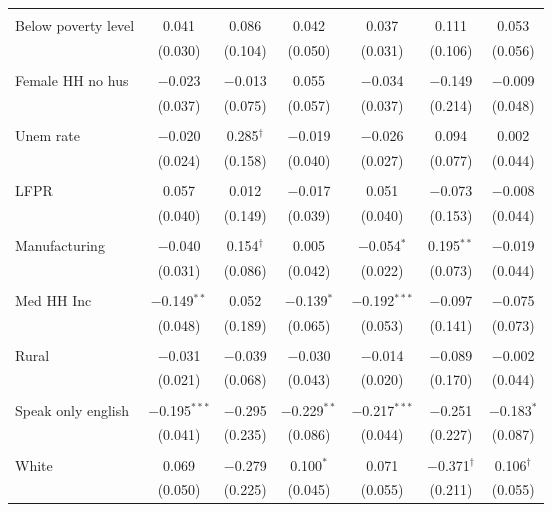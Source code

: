 \begin{table}[!htbp]
\begin{tabular}{@{\extracolsep{5pt}}lcccccc}
  & & & & & & \\ 
 Below poverty level & 0.041 & 0.086 & 0.042 & 0.037 & 0.111 & 0.053 \\ 
  & (0.030) & (0.104) & (0.050) & (0.031) & (0.106) & (0.056) \\ 
  & & & & & & \\ 
 Female HH no hus & $-$0.023 & $-$0.013 & 0.055 & $-$0.034 & $-$0.149 & $-$0.009 \\ 
  & (0.037) & (0.075) & (0.057) & (0.037) & (0.214) & (0.048) \\ 
  & & & & & & \\ 
 Unem rate & $-$0.020 & 0.285$^{\dag}$ & $-$0.019 & $-$0.026 & 0.094 & 0.002 \\ 
  & (0.024) & (0.158) & (0.040) & (0.027) & (0.077) & (0.044) \\ 
  & & & & & & \\ 
 LFPR & 0.057 & 0.012 & $-$0.017 & 0.051 & $-$0.073 & $-$0.008 \\ 
  & (0.040) & (0.149) & (0.039) & (0.040) & (0.153) & (0.044) \\ 
  & & & & & & \\ 
 Manufacturing & $-$0.040 & 0.154$^{\dag}$ & 0.005 & $-$0.054$^{*}$ & 0.195$^{**}$ & $-$0.019 \\ 
  & (0.031) & (0.086) & (0.042) & (0.022) & (0.073) & (0.044) \\ 
  & & & & & & \\ 
 Med HH Inc & $-$0.149$^{**}$ & 0.052 & $-$0.139$^{*}$ & $-$0.192$^{***}$ & $-$0.097 & $-$0.075 \\ 
  & (0.048) & (0.189) & (0.065) & (0.053) & (0.141) & (0.073) \\ 
  & & & & & & \\ 
 Rural & $-$0.031 & $-$0.039 & $-$0.030 & $-$0.014 & $-$0.089 & $-$0.002 \\ 
  & (0.021) & (0.068) & (0.043) & (0.020) & (0.170) & (0.044) \\ 
  & & & & & & \\ 
 Speak only english & $-$0.195$^{***}$ & $-$0.295 & $-$0.229$^{**}$ & $-$0.217$^{***}$ & $-$0.251 & $-$0.183$^{*}$ \\ 
  & (0.041) & (0.235) & (0.086) & (0.044) & (0.227) & (0.087) \\ 
  & & & & & & \\ 
 White & 0.069 & $-$0.279 & 0.100$^{*}$ & 0.071 & $-$0.371$^{\dag}$ & 0.106$^{\dag}$ \\ 
  & (0.050) & (0.225) & (0.045) & (0.055) & (0.211) & (0.055) \\ 

\end{tabular}
\end{table}
